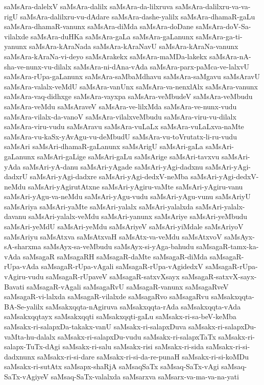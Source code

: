 {saMsAra-dalelxV
saMsAra-dalilx
saMsAra-da-lilxruva
saMsAra-dalilxru-va-va-rigU
saMsAra-dalilxru-vu-dAdare
saMsAra-dashe-yalilx
saMsAra-dhamaR-gaLu
saMsAra-dhamaR-vanunx
saMsAra-diMda
saMsAra-doDane
saMsAra-doV-Sa-vilalxde
saMsAra-duHKa
saMsAra-gaLa
saMsAra-gaLanunx
saMsAra-ga-ti-yanunx
saMsAra-kAraNada
saMsAra-kAraNavU
saMsAra-kAraNa-vanunx
saMsAra-kAraNa-vi-deyo
saMsArakekx
saMsAra-maMDa-lakekx
saMsAra-nA-sha-ve-nunx-vu-dilalx
saMsAra-ni-dAna-vAda
saMsAra-parx-paMca-ve-lalxvU
saMsAra-rUpa-gaLanunx
saMsAra-saMbaMdhavu
saMsAra-saMgavu
saMsAravU
saMsAra-valalx-veMdU
saMsAra-vanUnx
saMsAra-va-nenxlAlx
saMsAra-vanunx
saMsAra-vaq-didhxge
saMsAra-vayxpa
saMsAra-veMbudeV
saMsAra-veMbudu
saMsAra-veMdu
saMsAraveV
saMsAra-ve-lilxMda
saMsAra-ve-nunx-vudu
saMsAra-vilalx-da-vanoV
saMsAra-vilalxveMbudu
saMsAra-viru-vu-dilalx
saMsAra-viru-vudu
saMsAravu
saMsAra-vuLaLx
saMsAra-vuLaLxva-naMte
saMsAra-vu-kaSx-yAvAgu-vu-deMbudU
saMsAra-vu-toVrutatx-li-ru-vudu
saMsAri
saMsAri-dhamaR-gaLanunx
saMsArigU
saMsAri-gaLa
saMsAri-gaLanunx
saMsAri-gaLige
saMsAri-gaLu
saMsArige
saMsAri-tavxvu
saMsAri-yAda
saMsAri-yA-danu
saMsAri-yAgade
saMsAri-yAgi-dadxnu
saMsAri-yAgi-dadxrU
saMsAri-yAgi-dadxre
saMsAri-yAgi-dedxV-neMba
saMsAri-yAgi-dedxV-neMdu
saMsAri-yAgirutAtxne
saMsAri-yAgiru-vaMte
saMsAri-yAgiru-vanu
saMsAri-yAgu-va-neMdu
saMsAri-yAgu-vudu
saMsAri-yAgu-vunu
saMsAriyU
saMsAriya
saMsAri-yaMte
saMsAri-yalalx
saMsAri-yalalxda
saMsAri-yalalx-davanu
saMsAri-yalalx-veMdu
saMsAri-yanunx
saMsAriye
saMsAri-yeMbudu
saMsAri-yeMdU
saMsAri-yeMdu
saMsAriyeV
saMsAri-yiMdale
saMsAriyoV
saMsAriyu
saMsAtxva
saMsAtxvaH
saMsAtx-va-veMdu
saMsAtxvoV
saMsAyx-sA-sharxma
saMsAyx-sa-veMbudu
saMsAyx-si-yAga-bahudu
saMsagaR-tamx-ka-vAda
saMsagaR
saMsagaRH
saMsagaR-daMte
saMsagaR-diMda
saMsagaR-rUpa-vAda
saMsagaR-rUpa-vAgali
saMsagaR-rUpa-vAgidedxV
saMsagaR-rUpa-vAgiru-vudu
saMsagaR-rUpaveV
saMsagaR-satxvXsayx
saMsagaR-satxvX-sayx-Bavati
saMsagaR-vAgali
saMsagaRvU
saMsagaR-vanunx
saMsagaRveV
saMsagaR-vi-lalxda
saMsagaR-vilalxde
saMsagaRvo
saMsagaRvu
saMsakxqqta-BA-Se-yalilx
saMsakxqqta-nAgiruva
saMsakxqqta-rAda
saMsakxqqta-vAda
saMsakxqqtayx
saMsakxqqti
saMsakxqqti-gaLu
saMsakx-ri-sa-beV-keMba
saMsakx-ri-salapxDa-takakx-vanU
saMsakx-ri-salapxDuva
saMsakx-ri-salapxDu-vaMta-hu-dalalx
saMsakx-ri-salapxDu-vudu
saMsakx-ri-salapxTaTx
saMsakx-ri-salapx-TuTx-dAgi
saMsakx-ri-salu
saMsakx-risi
saMsakx-ri-sida
saMsakx-ri-si-dadxnunx
saMsakx-ri-si-dare
saMsakx-ri-si-da-re-punaH
saMsakx-ri-si-koMDu
saMsakx-ri-sutAtx
saMsapx-shaRjA
saMsaqSaTx
saMsaq-SaTx-vAgi
saMsaq-SaTx-vAgiyeV
saMsaq-SaTx-valalxda
saMsarxva
saMsarx-va-ma-va-na-yati
}
